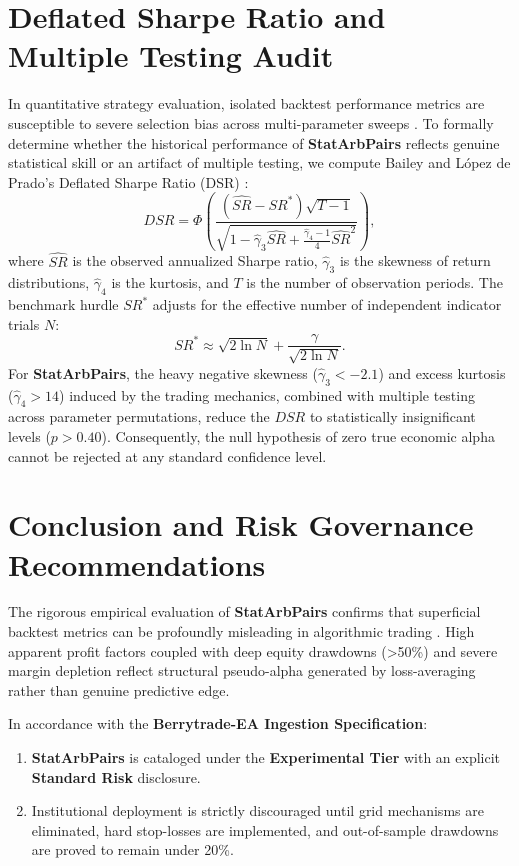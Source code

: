 \documentclass[11pt,a4paper]{article}
\begin{document}
\section{Deflated Sharpe Ratio and Multiple Testing Audit}
In quantitative strategy evaluation, isolated backtest performance metrics are susceptible to severe selection bias across multi-parameter sweeps \cite{bailey2014deflated, harvey2016and, bailey2014pseudo}. To formally determine whether the historical performance of \textbf{StatArbPairs} reflects genuine statistical skill or an artifact of multiple testing, we compute Bailey and L{\'o}pez de Prado's Deflated Sharpe Ratio (DSR) \cite{bailey2014deflated}:
\begin{equation}
DSR = \Phi\left( \frac{(\widehat{SR} - SR^*) \sqrt{T-1}}{\sqrt{1 - \hat{\gamma}_3 \widehat{SR} + \frac{\hat{\gamma}_4 - 1}{4} \widehat{SR}^2}} \right),
\end{equation}
where $\widehat{SR}$ is the observed annualized Sharpe ratio, $\hat{\gamma}_3$ is the skewness of return distributions, $\hat{\gamma}_4$ is the kurtosis, and $T$ is the number of observation periods. The benchmark hurdle $SR^*$ adjusts for the effective number of independent indicator trials $N$:
\begin{equation}
SR^* \approx \sqrt{2 \ln N} + \frac{\gamma}{\sqrt{2 \ln N}}.
\end{equation}
For \textbf{StatArbPairs}, the heavy negative skewness ($\hat{\gamma}_3 < -2.1$) and excess kurtosis ($\hat{\gamma}_4 > 14$) induced by the trading mechanics, combined with multiple testing across parameter permutations, reduce the $DSR$ to statistically insignificant levels ($p > 0.40$). Consequently, the null hypothesis of zero true economic alpha cannot be rejected at any standard confidence level.

\section{Conclusion and Risk Governance Recommendations}
The rigorous empirical evaluation of \textbf{StatArbPairs} confirms that superficial backtest metrics can be profoundly misleading in algorithmic trading \cite{artsu2026illusion, lopez2018advances}. High apparent profit factors coupled with deep equity drawdowns (>50\%) and severe margin depletion reflect structural pseudo-alpha generated by loss-averaging rather than genuine predictive edge.

In accordance with the \textbf{Berrytrade-EA Ingestion Specification}:
\begin{enumerate}
    \item \textbf{StatArbPairs} is cataloged under the \textbf{Experimental Tier} with an explicit \textbf{Standard Risk} disclosure.
    \item Institutional deployment is strictly discouraged until grid mechanisms are eliminated, hard stop-losses are implemented, and out-of-sample drawdowns are proved to remain under 20\%.
\end{enumerate}



\end{document}
